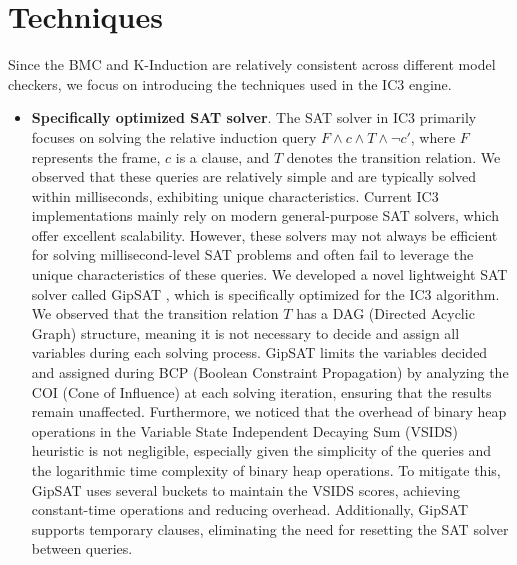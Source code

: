 \documentclass[runningheads]{llncs}
\begin{document}
\section{Techniques}
Since the BMC and K-Induction are relatively consistent across different model checkers, we focus on introducing the techniques used in the IC3 engine.
\begin{itemize}
    \item \textbf{Specifically optimized SAT solver}. The SAT solver in IC3 primarily focuses on solving the relative induction query $F \land c \land T \land \lnot c'$, where $F$ represents the frame, $c$ is a clause, and $T$ denotes the transition relation. We observed that these queries are relatively simple and are typically solved within milliseconds, exhibiting unique characteristics. Current IC3 implementations mainly rely on modern general-purpose SAT solvers, which offer excellent scalability. However, these solvers may not always be efficient for solving millisecond-level SAT problems and often fail to leverage the unique characteristics of these queries. We developed a novel lightweight SAT solver called GipSAT \cite{GipSAT}, which is specifically optimized for the IC3 algorithm. We observed that the transition relation $T$ has a DAG (Directed Acyclic Graph) structure, meaning it is not necessary to decide and assign all variables during each solving process. GipSAT limits the variables decided and assigned during BCP (Boolean Constraint Propagation) by analyzing the COI (Cone of Influence) at each solving iteration, ensuring that the results remain unaffected. Furthermore, we noticed that the overhead of binary heap operations in the Variable State Independent Decaying Sum (VSIDS) heuristic is not negligible, especially given the simplicity of the queries and the logarithmic time complexity of binary heap operations. To mitigate this, GipSAT uses several buckets to maintain the VSIDS scores, achieving constant-time operations and reducing overhead. Additionally, GipSAT supports temporary clauses, eliminating the need for resetting the SAT solver between queries.


\end{itemize}
\end{document}
